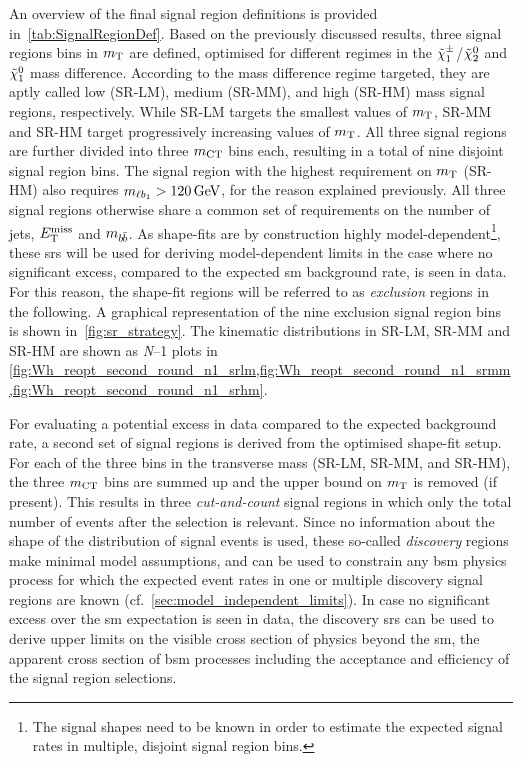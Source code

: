 An overview of the final signal region definitions is provided in~\cref{tab:SignalRegionDef}.
Based on the previously discussed results, three signal regions bins in $m_{\textrm{T}}$ are defined, optimised for different regimes in the \mbox{$\tilde{\chi}_1^\pm$/$\tilde{\chi}_2^0$} and $\tilde{\chi}_1^0$ mass difference. According to the mass difference regime targeted, they are aptly called low (SR-LM), medium (SR-MM), and high (SR-HM) mass signal regions, respectively.
While SR-LM targets the smallest values of $m_{\textrm{T}}$, SR-MM and SR-HM target progressively increasing values of $m_{\textrm{T}}$.
All three signal regions are further divided into three $m_{\textrm{CT}}$ bins each, resulting in a total of nine disjoint signal region bins. The signal region with the highest requirement on $m_{\textrm{T}}$ (SR-HM) also requires $\mlb>\SI{120}{\GeV}$, for the reason explained previously.
All three signal regions otherwise share a common set of requirements on the number of jets, $E_{\textrm{T}}^{\textrm{miss}}$ and $m_{b\hspace{-0.06em}\bar{b}}$.
As shape-fits are by construction highly model-dependent\footnote{The signal shapes need to be known in order to estimate the expected signal rates in multiple, disjoint signal region bins.}, these \glspl{sr} will be used for deriving model-dependent limits in the case where no significant excess, compared to the expected \gls{sm} background rate, is seen in data.
For this reason, the shape-fit regions will be referred to as \textit{exclusion} regions in the following. A graphical representation of the nine exclusion signal region bins is shown in~\cref{fig:sr_strategy}.
The kinematic distributions in SR-LM, SR-MM and SR-HM are shown as \textit{N}--1 plots in \cref{fig:Wh_reopt_second_round_n1_srlm,fig:Wh_reopt_second_round_n1_srmm,fig:Wh_reopt_second_round_n1_srhm}.

For evaluating a potential excess in data compared to the expected background rate, a second set of signal regions is derived from the optimised shape-fit setup.
For each of the three bins in the transverse mass (SR-LM, SR-MM, and SR-HM), the three $m_{\textrm{CT}}$ bins are summed up and the upper bound on $m_{\textrm{T}}$ is removed (if present).
This results in three \textit{cut-and-count} signal regions in which only the total number of events after the selection is relevant. Since no information about the shape of the distribution of signal events is used, these so-called \textit{discovery} regions make minimal model assumptions, and can be used to constrain any \gls{bsm} physics process for which the expected event rates in one or multiple discovery signal regions are known (cf.~\cref{sec:model_independent_limits}).
In case no significant excess over the \gls{sm} expectation is seen in data, the discovery \glspl{sr} can be used to derive upper limits on the visible cross section of physics beyond the \gls{sm}, \ie the apparent cross section of \gls{bsm} processes including the acceptance and efficiency of the signal region selections. 

